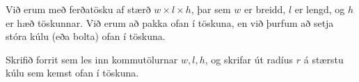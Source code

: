 \begin{problem}
	Við erum með ferðatösku af stærð $w\times l \times h$, þar sem $w$ er breidd, $l$ er lengd, og $h$ er hæð töskunnar. Við erum að pakka ofan í töskuna, en við þurfum að setja stóra kúlu (eða bolta) ofan í töskuna.

	Skrifið forrit sem les inn kommutölurnar $w, l, h$, og skrifar út radíus $r$ á stærstu kúlu sem kemst ofan í töskuna.

\begin{example}
%
\end{example}
\begin{example}
%
\end{example}
\end{problem}